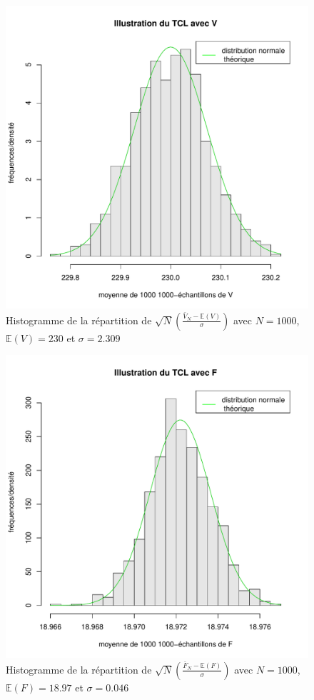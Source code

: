 \documentclass{article}
\begin{document}
\begin{figure}[!h]
\begin{center}
    \includegraphics[scale=0.7]{TCLv2_V.pdf}
    \caption{Histogramme de la répartition de $\sqrt{N}\left(\frac{\bar{V}_{N}-\mathbb{E}(V)}{\sigma}\right)$ avec $N=1000$, $\mathbb{E}(V)=230$ et $\sigma=2.309$}
    \label{TCL_V}
\end{center}
\end{figure}
\begin{figure}[!h]
\begin{center}
    \includegraphics[scale=0.7]{TCLv2_F.pdf}
    \caption{Histogramme de la répartition de $\sqrt{N}\left(\frac{\bar{F}_{N}-\mathbb{E}(F)}{\sigma}\right)$ avec $N=1000$, $\mathbb{E}(F)=18.97$ et $\sigma=0.046$}
    \label{TCL_F}
\end{center}
\end{figure}
\end{document}
